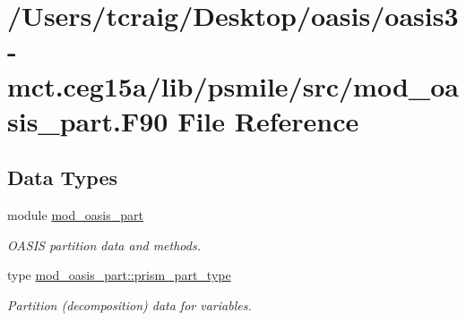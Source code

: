 \hypertarget{mod__oasis__part_8_f90}{\section{/\+Users/tcraig/\+Desktop/oasis/oasis3-\/mct.ceg15a/lib/psmile/src/mod\+\_\+oasis\+\_\+part.F90 File Reference}
\label{mod__oasis__part_8_f90}
}
\subsection*{Data Types}
\begin{DoxyCompactItemize}
\item 
module \hyperlink{classmod__oasis__part}{mod\+\_\+oasis\+\_\+part}
\begin{DoxyCompactList}\small\item\em O\+A\+S\+I\+S partition data and methods. \end{DoxyCompactList}\item 
type \hyperlink{structmod__oasis__part_1_1prism__part__type}{mod\+\_\+oasis\+\_\+part\+::prism\+\_\+part\+\_\+type}
\begin{DoxyCompactList}\small\item\em Partition (decomposition) data for variables. \end{DoxyCompactList}\end{DoxyCompactItemize}
